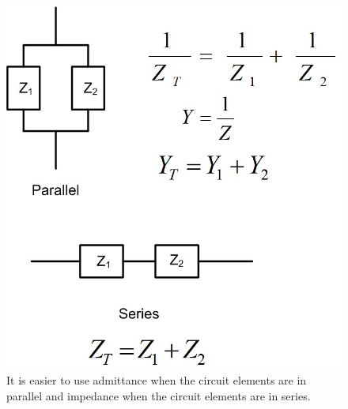 \documentclass{ximera}
\begin{document}
\begin{figure}[htbp]
\begin{center}
\includegraphics[scale=0.3]{../jpg/Impedance_Admittance.jpg}
\end{center}
\caption{It is easier to use admittance when the circuit elements are in parallel and impedance when the circuit elements are in series.}
\label{impadmtrans}
\end{figure}
\end{document}
